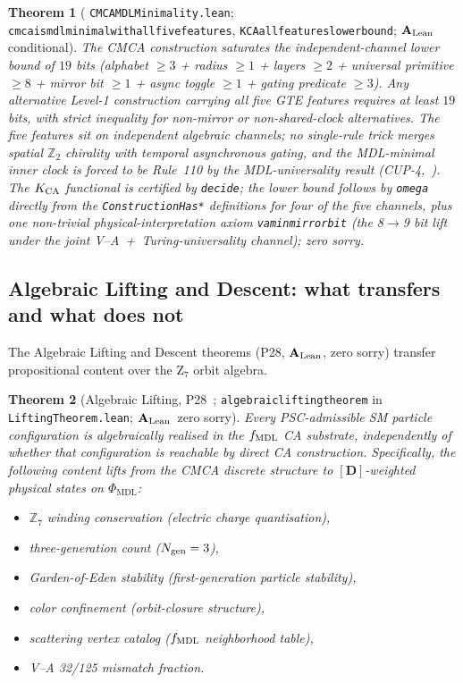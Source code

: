 \documentclass[11pt]{article}
\newtheorem{theorem}{Theorem}[section]
\theoremstyle{remark}
\newcommand{\PHIMDL}{\Phi_{\mathrm{MDL}}}
\newcommand{\ZS}{\mathbb{Z}_7}
\newcommand{\lean}[1]{%
  \penalty-100
  \begingroup\def\_{\textunderscore\allowbreak}\texttt{#1}\endgroup}
\newcommand{\CatAL}{\ensuremath{\textbf{A}_{\rm Lean}}}
\begin{document}
\begin{theorem}[\lean{CMCAMDLMinimality.lean};
  \lean{cmca\_is\_mdl\_minimal\_with\_all\_five\_features},
  \lean{K\_CA\_all\_features\_lower\_bound}; \CatAL{} conditional]
\label{thm:cmca_mdl_minimal}
The CMCA construction saturates the independent-channel lower bound of $19$ bits
(alphabet $\geq3$ + radius $\geq1$ + layers $\geq2$ + universal primitive $\geq8$
+ mirror bit $\geq1$ + async toggle $\geq1$ + gating predicate $\geq3$).
Any alternative Level-1 construction carrying all five GTE features requires at
least $19$ bits, with strict inequality for non-mirror or non-shared-clock
alternatives.  The five features sit on independent algebraic channels;
no single-rule trick merges spatial $\mathbb{Z}_2$ chirality with temporal
asynchronous gating, and the MDL-minimal inner clock is forced to be Rule~110
by the MDL-universality result (CUP-4,~\cite{SpivackCompUniversality}).
The $K_{\rm CA}$ functional is certified by \lean{decide}; the lower bound
follows by \lean{omega} directly from the \lean{ConstructionHas*} definitions
for four of the five channels, plus one non-trivial physical-interpretation
axiom \lean{va\_min\_mirror\_bit} (the 8$\to$9 bit lift under the joint
V--A~+~Turing-universality channel); zero sorry.
\end{theorem}

\subsection{Algebraic Lifting and Descent: what transfers and what does not}
\label{ssec:lifting_descent}

The Algebraic Lifting and Descent theorems (P28, \CatAL, zero sorry) transfer
propositional content over the Z$_7$ orbit algebra.

\begin{theorem}[Algebraic Lifting, P28~\cite{SpivackCompUniversality};
  \lean{algebraic\_lifting\_theorem} in \lean{LiftingTheorem.lean}; \CatAL\ zero sorry]
\label{thm:lifting}
Every PSC-admissible SM particle configuration is algebraically realised in
the $f_{\rm MDL}$ CA substrate, independently of whether that configuration
is reachable by direct CA construction.
Specifically, the following content \emph{lifts} from the CMCA discrete
structure to $[\mathbf{D}]$-weighted physical states on $\PHIMDL$:
\begin{itemize}[noitemsep]
  \item $\ZS$ winding conservation (electric charge quantisation),
  \item three-generation count ($N_{\rm gen}=3$),
  \item Garden-of-Eden stability (first-generation particle stability),
  \item color confinement (orbit-closure structure),
  \item scattering vertex catalog ($f_{\rm MDL}$ neighborhood table),
  \item V--A 32/125 mismatch fraction.
\end{itemize}
\end{theorem}
\end{document}
